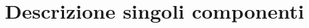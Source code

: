 
\newcommand{\lastversion}{\lastversionST}%
\newcommand{\doctitle}{\doctitleST}%
\newcommand{\info}{\infoST}


{}%




\section{Descrizione singoli componenti}%


